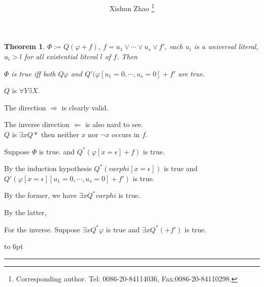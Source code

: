 \documentclass[12pt]{article}
\newtheorem{theorem}{Theorem}
\newenvironment{proof}{\parindent=0pt{\bf Proof: }}{
   \hspace*{\fill}\hbox to 6pt{\leaders\hrule width 6pt height 6pt\hfill}\par}
\begin{document}

\title{
}

\author{
Xishun Zhao \footnote{Corresponding author. Tel: 0086-20-84114036,
Fax:0086-20-84110298.}
}


\maketitle

\begin{abstract}

\end{abstract}

\begin{theorem}
$\Phi:=Q(\varphi+f)$, $f=u_1\vee \cdots\vee u_s\vee f'$, 
each $u_i$ is a universal literal, $u_i>l$ for all existential literal $l$ of $f$.  Then 

$\Phi$ is true iff both $Q\varphi$ and $Q'(\varphi[u_1=0,\cdots,u_s=0]+f'$ are true. 
\end{theorem}

\begin{proof}

$Q$ is $\forall Y\exists X$. 

The direction $\Longrightarrow$ is clearly valid. 



The inverse direction $\Longleftarrow$ is also nard to see.\\

$Q$ is $\exists xQ*$ then neither $x$ nor $\neg x$ occurs in $f$. 

Suppose $\Phi$ is true. and $Q^*(\varphi[x=\epsilon]+f)$ is true. 

By the  induction hypothesis $Q^*(varphi[x=\epsilon])$ is true and $Q'(\varphi[x=\epsilon][u_1=0,\cdots, u_s=0]+f')$ is true. 

By the former, we have $\exists xQ^*varphi$ is true. 

By the latter, 


For the inverse. Suppose $\exists xQ^*\varphi$ is true and $\exists xQ^*( +f')$ is true. 







\end{proof}
\end{document}
